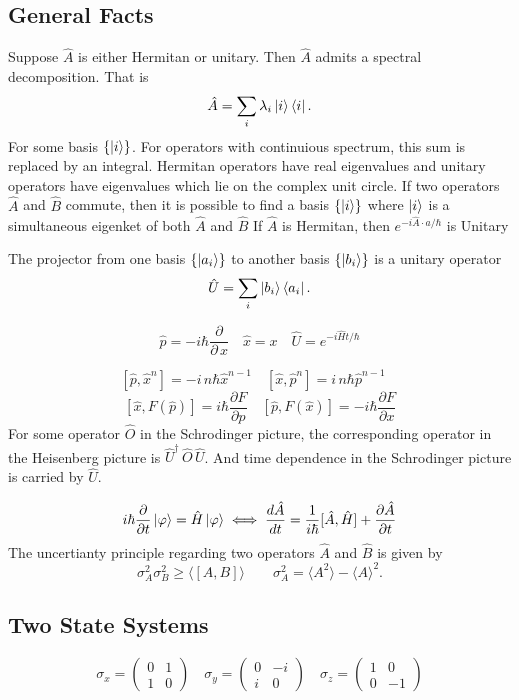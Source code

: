 \documentclass{article}
\begin{document}
  \twocolumn
    \subsection*{General Facts}
      Suppose $\hat{A}$ is either Hermitan or unitary. Then  $\hat{A}$ admits a 
      spectral decomposition. That is 
      \[
         \hat{A} = \sum_i \lambda_i \ket{i}\bra{i}
      .\] 
      For some basis $\{\ket{i} \}$. For operators with continuious spectrum,
      this sum is replaced by an integral. 
      Hermitan operators have real eigenvalues and unitary operators 
      have eigenvalues which lie on the complex unit circle.
      If two operators $\hat{A}$ and  $\hat{B}$ commute, then it is possible 
      to find a basis  $\{\ket{i}\}$ where $ \ket{i}$ is a simultaneous eigenket
      of both $\hat{A}$ and  $\hat{B}$
      If $\hat{A}$ is Hermitan, then  $e^{-i \hat{A} \cdot a / \hbar}$
      is Unitary

      The projector from one basis $ \{\ket{a_i}\}$ to another basis 
      $\{\ket{b_i}\}$ is a unitary operator \[
        \hat{U} = \sum_i \ket{b_i}\bra{a_i}
      .\] 
        
    \[
      \hat{p} = - i \hbar \frac{\partial}{\partial\,x} \quad
      \hat{x} = x \quad
      \hat{U} = e^{-i \hat{H} t / \hbar}
    \]
    
    \[
      [\hat{p},\hat{x}^n] = -i \,n \hbar \hat{x}^{n-1} \quad
      [\hat{x},\hat{p}^n] = i\,n  \hbar \hat{p}^{n-1} \quad
    \]
    \[
      [\hat{x},F(\hat{p})] = i \hbar \frac{\partial F}{\partial p} \quad
      [\hat{p},F(\hat{x})] =-i \hbar \frac{\partial F}{\partial x}
    \] 
    For some operator \(\hat{O}\) in the Schrodinger picture,
    the corresponding operator in the Heisenberg picture is 
    \(\hat{U}^\dagger\, \hat{O} \, \hat{U}\). And time dependence 
    in the Schrodinger picture is carried by \(\hat{U}\).
    

    \[
      i \hbar \frac{\partial}{\partial t} \ket{\varphi} = \hat{H} \ket{\varphi} 
      \iff \frac{d \hat{A}}{dt} = \frac{1}{i \hbar}[\hat{A},\hat{H}] + 
      \frac{\partial \hat{A}}{\partial t} 
    \]
   The uncertianty principle regarding two operators $\hat A$ and  $\hat B$ is given by 
   \[
     \sigma_{A}^{2}\sigma_B^2 \geq \langle [A,B] \rangle \qquad
     \sigma_A^2 = \langle A^2 \rangle - \langle A\rangle ^2 
   .\] 

    \subsection*{Two State Systems}
      \[
      \sigma_x = \begin{pmatrix} 0 & 1 \\ 1 & 0 \end{pmatrix} \quad
      \sigma_y = \begin{pmatrix} 0 & -i \\ i & 0 \end{pmatrix} \quad
      \sigma_z = \begin{pmatrix} 1 & 0 \\ 0 & -1 \end{pmatrix}
    \]
\end{document}
